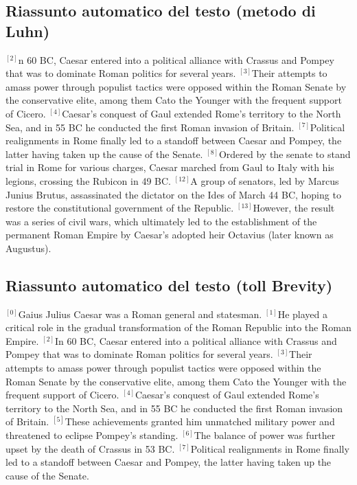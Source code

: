 \subsection*{Riassunto automatico del testo (metodo di Luhn)}
\begin{small}
{$^{[2]}$}n 60 BC, Caesar entered into a political alliance with Crassus and Pompey that was to dominate Roman politics for several years.
{$^{[3]}$}Their attempts to amass power through populist tactics were opposed within the Roman Senate by the conservative elite, among them Cato the Younger with the frequent support of Cicero.
{$^{[4]}$}Caesar's conquest of Gaul extended Rome's territory to the North Sea, and in 55 BC he conducted the first Roman invasion of Britain.
{$^{[7]}$}Political realignments in Rome finally led to a standoff between Caesar and Pompey, the latter having taken up the cause of the Senate.
{$^{[8]}$}Ordered by the senate to stand trial in Rome for various charges, Caesar marched from Gaul to Italy with his legions, crossing the Rubicon in 49 BC.
{$^{[12]}$}A group of senators, led by Marcus Junius Brutus, assassinated the dictator on the Ides of March 44 BC, hoping to restore the constitutional government of the Republic.
{$^{[13]}$}However, the result was a series of civil wars, which ultimately led to the establishment of the permanent Roman Empire by Caesar's adopted heir Octavius (later known as Augustus).
\vfill
\end{small}

\subsection*{Riassunto automatico del testo (toll Brevity)}
\begin{small}
{$^{[0]}$}Gaius Julius Caesar was a Roman general and statesman. 
{$^{[1]}$}He played a critical role in the gradual transformation of the Roman Republic into the Roman Empire. 
{$^{[2]}$}In 60 BC, Caesar entered into a political alliance with Crassus and Pompey that was to dominate Roman politics for several years. 
{$^{[3]}$}Their attempts to amass power through populist tactics were opposed within the Roman Senate by the conservative elite, among them Cato the Younger with the frequent support of Cicero. 
{$^{[4]}$}Caesar's conquest of Gaul extended Rome's territory to the North Sea, and in 55 BC he conducted the first Roman invasion of Britain. 
{$^{[5]}$}These achievements granted him unmatched military power and threatened to eclipse Pompey's standing. 
{$^{[6]}$}The balance of power was further upset by the death of Crassus in 53 BC. 
{$^{[7]}$}Political realignments in Rome finally led to a standoff between Caesar and Pompey, the latter having taken up the cause of the Senate.
\vfill
\end{small}

